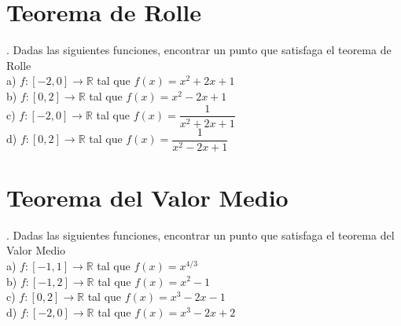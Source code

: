 \documentclass[letterpaper]{article}
\begin{document}
\section*{Teorema de Rolle}

. Dadas las siguientes funciones, encontrar un punto que satisfaga el teorema de Rolle\\

a) $ f : [-2,0] \longrightarrow \mathds{R} $ tal que $ f(x) = x^{2} + 2x + 1 $\\


b) $ f : [0,2] \longrightarrow \mathds{R} $ tal que $ f(x) = x^{2} - 2x + 1 $\\


c) $ f : [-2,0] \longrightarrow \mathds{R} $ tal que $ f(x) = \dfrac{1}{x^{2} + 2x + 1} $\\


d) $ f : [0,2] \longrightarrow \mathds{R} $ tal que $ f(x) =\dfrac{1}{x^{2} - 2x + 1} $\\


\section*{Teorema del Valor Medio}

. Dadas las siguientes funciones, encontrar un punto que satisfaga el teorema del Valor Medio \\

a) $ f : [-1,1] \longrightarrow \mathds{R} $ tal que $ f(x) = x^{4/3} $\\


b) $ f : [-1,2] \longrightarrow \mathds{R} $ tal que $ f(x) = x^{2} -1$\\


c) $ f : [0,2] \longrightarrow \mathds{R} $ tal que $ f(x) = x^{3} - 2x -1 $\\


d) $ f : [-2,0] \longrightarrow \mathds{R} $ tal que $ f(x) = x^{3} - 2x + 2 $\\

\end{document}
